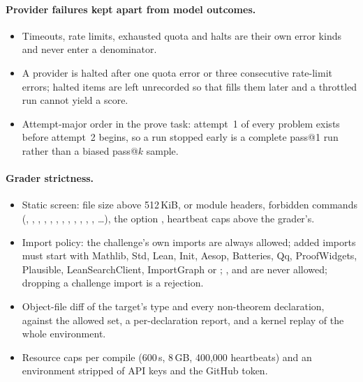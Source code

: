 \documentclass[11pt,a4paper]{article}
\begin{document}
\paragraph{Provider failures kept apart from model outcomes.}
\begin{itemize}
\item Timeouts, rate limits, exhausted quota and halts are their own error kinds and never enter a denominator.
\item A provider is halted after one quota error or three consecutive rate-limit errors; halted items are left unrecorded so that  fills them later and a throttled run cannot yield a score.
\item Attempt-major order in the prove task: attempt~1 of every problem exists before attempt~2 begins, so a run stopped early is a complete pass@1 run rather than a biased pass@$k$ sample.
\end{itemize}

\paragraph{Grader strictness.}
\begin{itemize}
\item Static screen: file size above 512\,KiB,  or module headers, forbidden commands (, , , , , , , , , , , , \dots), the option , heartbeat caps above the grader's.
\item Import policy: the challenge's own imports are always allowed; added imports must start with Mathlib, Std, Lean, Init, Aesop, Batteries, Qq, ProofWidgets, Plausible, LeanSearchClient, ImportGraph or ; ,  and  are never allowed; dropping a challenge import is a rejection.
\item Object-file diff of the target's type and every non-theorem declaration,  against the allowed set, a per-declaration  report, and a kernel replay of the whole environment.
\item Resource caps per compile (600\,s, 8\,GB, 400,000 heartbeats) and an environment stripped of API keys and the GitHub token.
\end{itemize}
\end{document}

